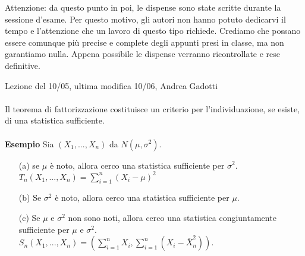 
\newpage

\vspace*{\fill}
\noindent \large Attenzione: da questo punto in poi, le dispense sono state scritte durante la sessione d'esame. Per questo motivo, gli autori non hanno potuto dedicarvi il tempo e l'attenzione che un lavoro di questo tipo richiede. Crediamo che possano essere comunque più precise e complete degli appunti presi in classe, ma non garantiamo nulla. Appena possibile le dispense verranno ricontrollate e rese definitive.
\vspace*{\fill}
\newpage



Lezione del 10/05, ultima modifica 10/06, Andrea Gadotti\\
\\
Il teorema di fattorizzazione costituisce un criterio per l'individuazione, se esiste, di una statistica sufficiente.
\\
\\
\textbf{Esempio} Sia $(X_1,...,X_n)$ da $N(\mu,\sigma^2)$.
\begin{enumerate}
\item [(a)] se $\mu$ è noto, allora cerco una statistica sufficiente per $\sigma^2$.\\
$T_n (X_1,...,X_n) = \displaystyle\sum_{i=1}^n (X_i-\mu)^2$
\item [(b)] Se $\sigma^2$ è noto, allora cerco una statistica sufficiente per $\mu$.
\item [(c)] Se $\mu$ e $\sigma^2$ non sono noti, allora cerco una statistica congiuntamente sufficiente per $\mu$ e $\sigma^2$.\\
$S_n (X_1,...,X_n) = \left( \sum_{i=1}^n X_i, \sum_{i=1}^n (X_i - \overline{X}_n^2) \right)$.
\end{enumerate}

